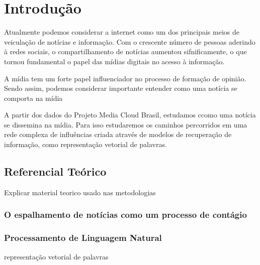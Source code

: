 \documentclass[a4paper,12pt]{article}
\begin{document}
\pagebreak

\section{Introdução}

Atualmente podemos considerar a internet como um dos principais meios de veiculação de notícias e informação. Com o crescente
número de pessoas aderindo à redes sociais, o compartilhamento de notícias aumentou sifnificamente, o que tornou fundamental
o papel das mídias digitais no acesso à informação.




A mídia tem um forte papel influenciador no processo de formação de opinião. Sendo assim, podemos considerar 
importante entender como uma notícia se comporta na mídia

A partir dos dados do Projeto Media Cloud Brasil, estudamos ccomo uma notícia se dissemina na mídia. Para isso
estudaremos os caminhos percorridos em uma rede complexa de influências criada através de modelos de recuperação de informação, 
como representação vetorial de palavras.

\subsection{Referencial Teórico}

Explicar material teorico usado nas metodologias
\subsubsection{O espalhamento de notícias como um processo de contágio}
\subsubsection{Processamento de Linguagem Natural}
\label{sec:nlp}
representação vetorial de palavras
\end{document}
